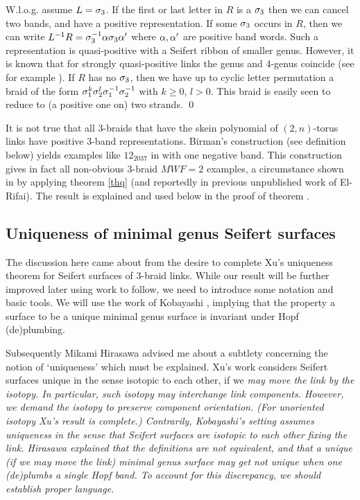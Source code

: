 W.l.o.g. assume $L=\sigma_3$. If the first or last letter in $R$
is a $\sigma_3$ then we can cancel two bands, and have a positive
representation. If some $\sigma_3$ occurs in $R$, then we can write
$L^{-1}R=\sigma_3^{-1}\alpha\sigma_3\alpha'$ where $\alpha,\alpha'$ are positive
band words. Such a representation is quasi-positive with a Seifert
ribbon \cite{Rudolph} of smaller genus. However, it is known that
for strongly quasi-positive links the genus and 4-genus coincide
(see for example \cite{posqp}). If $R$ has no $\sigma_3$, then
we have up to cyclic letter permutation a braid of the form
$\sigma_1^k\sigma_2^l\sigma_1^{-1}\sigma_2^{-1}$ with $k\ge 0$, $l>0$. This
braid is easily seen to reduce to (a positive one on) two strands.
\qed

\begin{rem}\label{rqw}
It is not true that all 3-braids that have the skein polynomial of
$(2,n)$-torus links have positive 3-band representations. Birman's
\cite{Birman} construction (see definition  below)
yields examples like $12_{2037}$ in \cite{KnotScape} with one
negative band. This construction gives in fact all non-obvious
3-braid $MWF=2$ examples, a circumstance shown in \cite{ntriv} by
applying theorem \ref{thq} (and reportedly in previous unpublished
work of El-Rifai). The result is explained and used below in the
proof of theorem .
\end{rem}

\subsection{Uniqueness of minimal genus Seifert surfaces\label{Uq}}

The discussion here came about from the desire to complete Xu's
uniqueness theorem for Seifert surfaces of 3-braid links. While
our result will be further improved later using work to follow,
we need to introduce some notation and basic tools. We will use
the work of Kobayashi \cite{Kobayashi}, implying that the property
a surface to be a unique minimal genus surface is invariant under
Hopf (de)plumbing.

Subsequently Mikami Hirasawa advised me about a subtlety
concerning the notion of `uniqueness' which must be explained.
Xu's work considers Seifert surfaces unique in the sense isotopic
to each other, if we \em{may move} the link by the isotopy.
In particular, such isotopy may interchange link components.
However, we demand the isotopy to preserve component orientation.
(For unoriented isotopy Xu's result is complete.) Contrarily,
Kobayashi's setting assumes uniqueness in the sense that
Seifert surfaces are isotopic to each other \em{fixing} the link.
Hirasawa explained that the definitions are not equivalent, and
that a unique (if we may move the link) minimal genus surface
may get not unique when one (de)plumbs a single Hopf band. To
account for this discrepancy, we should establish proper language.

